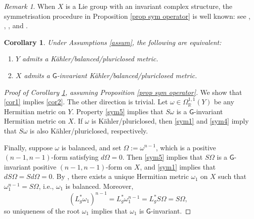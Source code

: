 \documentclass[11pt,reqno]{amsart}
\newcommand{\R}{\mathbb R}
\newcommand{\G}{\mathsf {G}}
\theoremstyle{plain}
\newtheorem{corollary}[theorem]{Corollary}
\theoremstyle{definition}
\theoremstyle{remark}
\newtheorem{remark}[theorem]{Remark}
\begin{document}
\begin{remark}
    When $X$ is a Lie group with an invariant complex structure, the symmetrisation procedure in Proposition \ref{prop sym operator} is well known: see \cite[Proposition 2.2]{kwong2026},
\cite[Section 2]{fino_grant_2004}, \cite[Prop 3.6]{ugarte}, \cite[Theorem 7]{belgun} and  \cite[Propositions 2.1 and 2.3]{giusti_podesta_2023}.
\end{remark}
\begin{corollary}
    \label{cor sym}
    Under Assumptions \ref{assum}, the following are equivalent:
    \begin{enumerate}
        \item \label{cor1}$Y$ admits a K\"ahler/balanced/pluriclosed metric.
        \item \label{cor2}$X$ admits a $\G$-invariant K\"ahler/balanced/pluriclosed metric.
    \end{enumerate}
\end{corollary}
\begin{proof}[Proof of Corollary \ref{cor sym}, assuming Proposition \ref{prop sym operator}]
    We show that \eqref{cor1} implies \eqref{cor2}. The other direction is trivial.
    Let $ \omega \in \Omega^{1,1}_\R(Y)$ be any Hermitian metric on $Y$. Property \eqref{sym5} implies that $S \omega$ is a $\G$-invariant Hermitian metric on $X$. If $\omega$ is K\"ahler/pluriclosed, then \eqref{sym1} and \eqref{sym4} imply that $S \omega$ is also K\"ahler/pluriclosed, respectively.

    Finally, suppose $\omega$ is balanced, and set $\Omega := \omega^{n-1}$, which is a positive $(n-1,n-1)$-form satisfying $d \Omega = 0$. Then \eqref{sym5} implies that $S \Omega$ is a $\G$-invariant positive $(n-1,n-1)$-form on $X$, and \eqref{sym1} implies that $d S \Omega = S d \Omega = 0$. By \cite[Section 4]{michelsohn_1982},  there exists a unique Hermitian metric $\omega_1$ on $X$ such that $\omega_1^{n-1} = S \Omega$, i.e., $\omega_1$ is balanced. Moreover, 
    $$(L_g^* \omega_1)^{n-1} = L_g^* \omega_1^{n-1} = L_g^* S \Omega = S \Omega,$$
    so uniqueness of the root $\omega_1$ implies that $\omega_1$ is $\G$-invariant.
\end{proof}
\end{document}
